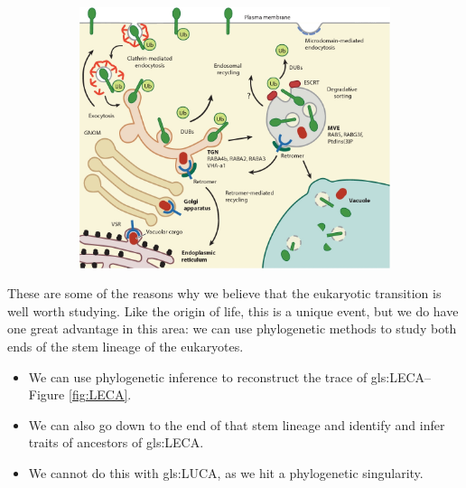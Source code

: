 \documentclass[]{article}
\begin{document}
\begin{figure}[H]
\begin{subfigure}[b]{0.45\textwidth}
	\end{subfigure}
	\begin{subfigure}[b]{0.45\textwidth}
	\includegraphics[width=\textwidth]{Regulation2}
	\end{subfigure}
\end{figure}

These are some of the reasons why we believe that the eukaryotic transition is well worth studying. Like the origin of life, this is a unique event, but we do have one great advantage in this area:  we can use phylogenetic methods to study both ends of the stem lineage of the eukaryotes.


\begin{itemize}
	\item We can use phylogenetic inference  to reconstruct the trace of \gls{gls:LECA}--Figure \ref {fig:LECA}.
	
	\item We can also go down to the end of that stem lineage and identify and infer traits of ancestors of \gls{gls:LECA}.
	
	\item  We cannot do this with \gls{gls:LUCA}, as we hit a phylogenetic singularity.

\end{itemize}
\end{document}
